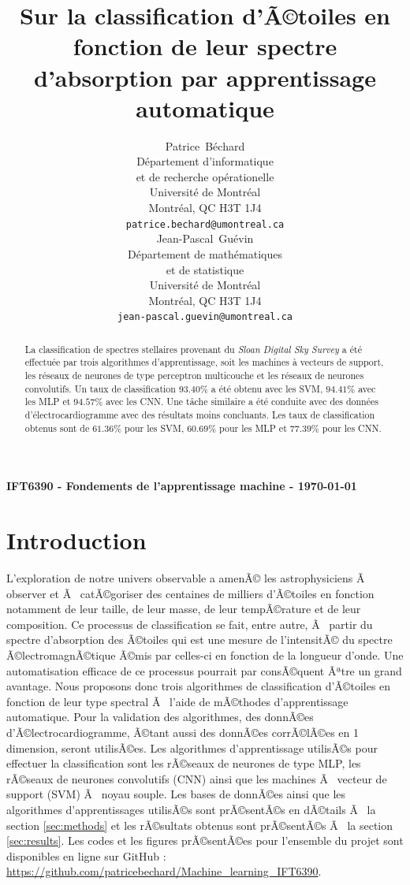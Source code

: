 \documentclass{article}
\title{Sur la classification d'Ã©toiles en fonction de leur spectre d'absorption par apprentissage automatique}
\author{
  Patrice~B\'echard\\
  D\'epartement d'informatique\\
  et de recherche op\'erationelle\\
  Universit\'e de Montr\'eal\\
  Montr\'eal, QC H3T 1J4 \\
  \texttt{patrice.bechard@umontreal.ca} \\
  \And
  Jean-Pascal~Gu\'evin \\
  D\'epartement de math\'ematiques\\
  et de statistique \\
  Universit\'e de Montr\'eal\\
  Montr\'eal, QC H3T 1J4 \\
  \texttt{jean-pascal.guevin@umontreal.ca} \\
}
\begin{document}

\maketitle
\vspace{-0.8cm}
\begin{center}
\textbf{IFT6390 - Fondements de l'apprentissage machine - \today}
\end{center}

\begin{abstract}
La classification de spectres stellaires provenant du \textit{Sloan Digital Sky Survey} a été effectuée par trois algorithmes d'apprentissage, soit les machines à vecteurs de support, les réseaux de neurones de type perceptron multicouche et les réseaux de neurones convolutifs. Un taux de classification $93.40\%$ a été obtenu avec les SVM, $94.41\%$ avec les MLP et $94.57\%$ avec les CNN. Une tâche similaire a été conduite avec des données d'électrocardiogramme avec des résultats moins concluants. Les taux de classification obtenus sont de $61.36\%$ pour les SVM, $60.69\%$ pour les MLP et $77.39\%$ pour les CNN.
\end{abstract}

\section{Introduction}

L'exploration de notre univers observable a amenÃ© les astrophysiciens Ã  observer et Ã  catÃ©goriser des centaines de milliers d'Ã©toiles en fonction notamment de leur taille, de leur masse, de leur tempÃ©rature et de leur composition. Ce processus de classification se fait, entre autre, Ã  partir du spectre d'absorption des Ã©toiles qui est une mesure de l'intensitÃ© du spectre Ã©lectromagnÃ©tique Ã©mis par celles-ci en fonction de la longueur d'onde. Une automatisation efficace de ce processus pourrait par consÃ©quent Ãªtre un grand avantage. Nous proposons donc trois algorithmes de classification d'Ã©toiles en fonction de leur type spectral Ã  l'aide de mÃ©thodes d'apprentissage automatique.  Pour la validation des algorithmes, des donnÃ©es d'Ã©lectrocardiogramme, Ã©tant aussi des donnÃ©es corrÃ©lÃ©es en 1 dimension, seront utilisÃ©es. Les algorithmes d'apprentissage utilisÃ©s pour effectuer la classification sont les rÃ©seaux de neurones de type MLP, les rÃ©seaux de neurones convolutifs (CNN) ainsi que les machines Ã  vecteur de support (SVM) Ã  noyau souple. Les bases de donnÃ©es ainsi que les algorithmes d'apprentissages utilisÃ©s sont prÃ©sentÃ©s en dÃ©tails Ã  la section \ref{sec:methods} et les rÃ©sultats obtenus sont prÃ©sentÃ©s Ã  la section \ref{sec:results}. Les codes et les figures prÃ©sentÃ©es pour l'ensemble du projet sont disponibles en ligne sur GitHub : \url{https://github.com/patricebechard/Machine_learning_IFT6390}.
\end{document}
